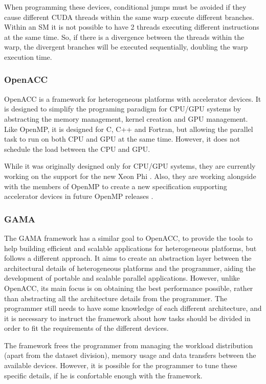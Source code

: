 When programming these devices, conditional jumps must be avoided if they cause different CUDA threads within the same warp execute different branches. Within an SM it is not possible to have 2 threads executing different instructions at the same time. So, if there is a divergence between the threads within the warp, the divergent branches will be executed sequentially, doubling the warp execution time.

\subsubsection*{OpenACC}
\label{OpenACC}

OpenACC \cite{OpenACC} is a framework for heterogeneous platforms with accelerator devices. It is designed to simplify the programing paradigm for CPU/GPU systems by abstracting the memory management, kernel creation and GPU management. Like OpenMP, it is designed for C, C++ and Fortran, but allowing the parallel task to run on both CPU and GPU at the same time. However, it does not schedule the load between the CPU and GPU.

While it was originally designed only for CPU/GPU systems, they are currently working on the support for the new \intel Xeon Phi \cite{OpenACC:HPCWire}. Also, they are working alongside with the members of OpenMP to create a new specification supporting accelerator devices in future OpenMP releases \cite{OpenACC:OpenMP}.

\subsubsection*{GAMA}
\label{GAMA}

The GAMA framework \cite{GAMA} has a similar goal to OpenACC, to provide the tools to help building efficient and scalable applications for heterogeneous platforms, but follows a different approach. It aims to create an abstraction layer between the architectural details of heterogeneous platforms and the programmer, aiding the development of portable and scalable parallel applications. However, unlike OpenACC, its main focus is on obtaining the best performance possible, rather than abstracting all the architecture details from the programmer. The programmer still needs to have some knowledge of each different architecture, and it is necessary to instruct the framework about how tasks should be divided in order to fit the requirements of the different devices.

The framework frees the programmer from managing the workload distribution (apart from the dataset division), memory usage and data transfers between the available devices. However, it is possible for the programmer to tune these specific details, if he is confortable enough with the framework.

